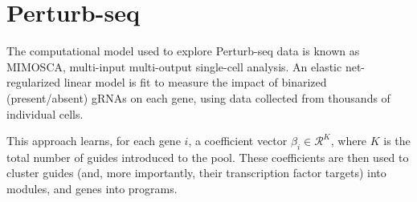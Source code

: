 \documentclass[letterpaper, 11pt]{article}
\begin{document}
\section*{Perturb-seq}
The computational model used to explore Perturb-seq data is known as MIMOSCA, multi-input multi-output single-cell analysis. An elastic net-regularized linear model is fit to measure the impact of binarized (present/absent) gRNAs on each gene, using data collected from thousands of individual cells.
\begin{figure}[H]
	\begin{center}
	\end{center}
\end{figure}
This approach learns, for each gene $i$, a coefficient vector $\beta_i \in \mathcal{R}^K$, where $K$ is the total number of guides introduced to the pool. These coefficients are then used to cluster guides (and, more importantly, their transcription factor targets) into modules, and genes into programs.
\end{document}
